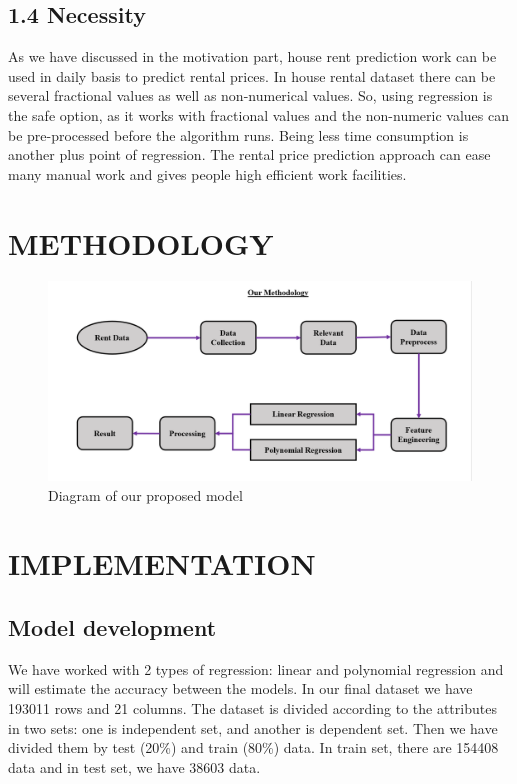 \documentclass[conference]{IEEEtran}[10]
\begin{document}
\subsection*{1.4 Necessity}
As we have discussed in the motivation part, house rent prediction work can be used in daily basis to predict rental prices. In house rental dataset there can be several fractional values as well as non-numerical values. So, using regression is the safe option, as it works with fractional values and the non-numeric values can be pre-processed before the algorithm runs. Being less time consumption is another plus point of regression. The rental price prediction approach can ease many  manual work and gives people high efficient work facilities. 

\section{METHODOLOGY}
\begin{figure}[H]
\centering
\includegraphics[scale=0.2]{methodology}
\caption{ Diagram of our proposed model}
\end{figure}
\section{IMPLEMENTATION}
\subsection{Model development}
We have worked with 2 types of regression: linear and polynomial regression and will estimate the accuracy between the models. In our final dataset we have 193011 rows and 21 columns. The dataset is divided according to the attributes in two sets: one is independent set, and another is dependent set. Then we have divided them by test (20\%) and train (80\%) data. In train set, there are 154408 data and in test set, we have 38603 data.
\end{document}
